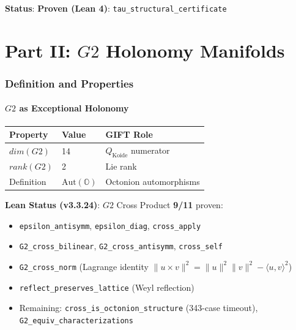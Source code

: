 \documentclass[11pt,a4paper]{article}
\newcommand{\Gtwo}{\mathrm{G}_2}
\newcommand{\dimE}{\mathrm{dim}}
\newcommand{\rk}{\mathrm{rank}}
\newcommand{\proven}{\textsc{Proven}}
\def\Gtwo{G2}%
\def\dimE{dim}%
\def\rk{rank}%
\def\proven{Proven}%
\begin{document}
\textbf{Status}: \textbf{\proven{} (Lean 4)}: \texttt{tau\_structural\_certificate}

\newpage
\part*{Part II: $\Gtwo$ Holonomy Manifolds}

\section{Definition and Properties}

\subsection{$\Gtwo$ as Exceptional Holonomy}

\begin{table}[H]
\centering
\begin{tabular}{lll}
\toprule
Property & Value & GIFT Role \\
\midrule
$\dimE(\Gtwo)$ & 14 & $Q_{\mathrm{Koide}}$ numerator \\
$\rk(\Gtwo)$ & 2 & Lie rank \\
Definition & $\mathrm{Aut}(\mathbb{O})$ & Octonion automorphisms \\
\bottomrule
\end{tabular}
\end{table}

\textbf{Lean Status (v3.3.24)}: $\Gtwo$ Cross Product \textbf{9/11} proven:
\begin{itemize}
\item \texttt{epsilon\_antisymm}, \texttt{epsilon\_diag}, \texttt{cross\_apply} \checkmark
\item \texttt{G2\_cross\_bilinear}, \texttt{G2\_cross\_antisymm}, \texttt{cross\_self} \checkmark
\item \texttt{G2\_cross\_norm} (Lagrange identity $\|u\times v\|^2 = \|u\|^2\|v\|^2 - \langle u,v\rangle^2$) \checkmark
\item \texttt{reflect\_preserves\_lattice} (Weyl reflection) \checkmark
\item Remaining: \texttt{cross\_is\_octonion\_structure} (343-case timeout), \texttt{G2\_equiv\_characterizations}
\end{itemize}
\end{document}
